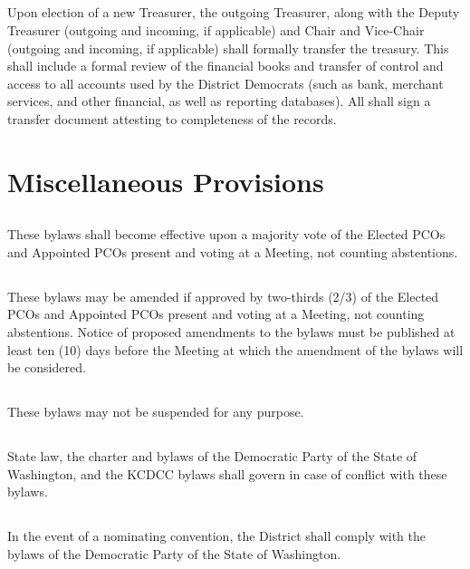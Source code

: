 \documentclass{article}
\newcommand{\fortythird}{\nth{43}}
\newcommand{\district}{\fortythird{} District}
\newcommand{\thedistrict}{the \district{}}
\begin{document}
\subsection{}
Upon election of a new Treasurer, the outgoing Treasurer, along with the Deputy Treasurer (outgoing and incoming, if applicable) and Chair and Vice-Chair (outgoing and incoming, if applicable) shall formally transfer the treasury. This shall include a formal review of the financial books and transfer of control and access to all accounts used by \thedistrict{} Democrats (such as bank, merchant services, and other financial, as well as reporting databases). All shall sign a transfer document attesting to completeness of the records.

\section{Miscellaneous Provisions}
\subsection{}
These bylaws shall become effective upon a majority vote of the Elected PCOs and Appointed PCOs present and voting at a Meeting, not counting abstentions.

\subsection{}
These bylaws may be amended if approved by two-thirds (2/3) of the Elected PCOs and Appointed PCOs present and voting at a Meeting, not counting abstentions. Notice of proposed amendments to the bylaws must be published at least ten (10) days before the Meeting at which the amendment of the bylaws will be considered.

\subsection{}
These bylaws may not be suspended for any purpose.

\subsection{}
State law, the charter and bylaws of the Democratic Party of the State of Washington, and the KCDCC bylaws shall govern in case of conflict with these bylaws.

\subsection{}
In the event of a nominating convention, \thedistrict{} shall comply with the bylaws of the Democratic Party of the State of Washington.
\end{document}
